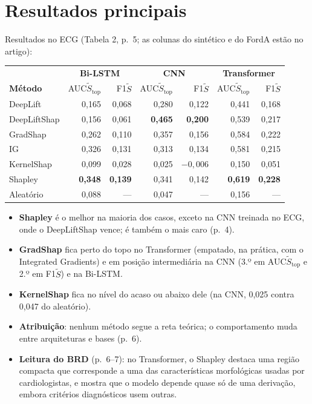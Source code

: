 \documentclass[11pt,a4paper]{article}
\begin{document}
\section{Resultados principais}
Resultados no ECG (Tabela 2, p.~5; as colunas do sintético e do FordA estão no artigo):
\begin{center}\small
\begin{tabular}{l|rr|rr|rr}
\toprule
& \multicolumn{2}{c|}{\textbf{Bi-LSTM}} & \multicolumn{2}{c|}{\textbf{CNN}} & \multicolumn{2}{c}{\textbf{Transformer}} \\
\textbf{Método} & AUC$\tilde{S}_{\text{top}}$ & F1$\tilde{S}$ & AUC$\tilde{S}_{\text{top}}$ & F1$\tilde{S}$ & AUC$\tilde{S}_{\text{top}}$ & F1$\tilde{S}$ \\
\midrule
DeepLift     & 0,165 & 0,068 & 0,280 & 0,122 & 0,441 & 0,168 \\
DeepLiftShap & 0,156 & 0,061 & \textbf{0,465} & \textbf{0,200} & 0,539 & 0,217 \\
GradShap     & 0,262 & 0,110 & 0,357 & 0,156 & 0,584 & 0,222 \\
IG           & 0,326 & 0,131 & 0,313 & 0,134 & 0,581 & 0,215 \\
KernelShap   & 0,099 & 0,028 & 0,025 & $-0{,}006$ & 0,150 & 0,051 \\
Shapley      & \textbf{0,348} & \textbf{0,139} & 0,341 & 0,142 & \textbf{0,619} & \textbf{0,228} \\
Aleatório    & 0,088 & --- & 0,047 & --- & 0,156 & --- \\
\bottomrule
\end{tabular}
\end{center}
\begin{itemize}
\item \textbf{Shapley} é o melhor na maioria dos casos, exceto na CNN treinada no ECG, onde o DeepLiftShap vence; é também o mais caro (p.~4).
\item \textbf{GradShap} fica perto do topo no Transformer (empatado, na prática, com o Integrated Gradients) e em posição intermediária na CNN (3.º em AUC$\tilde{S}_{\text{top}}$ e 2.º em F1$\tilde{S}$) e na Bi-LSTM.
\item \textbf{KernelShap} fica no nível do acaso ou abaixo dele (na CNN, 0,025 contra 0,047 do aleatório).
\item \textbf{Atribuição}: nenhum método segue a reta teórica; o comportamento muda entre arquiteturas e bases (p.~6).
\item \textbf{Leitura do BRD} (p.~6--7): no Transformer, o Shapley destaca uma região compacta que corresponde a uma das características morfológicas usadas por cardiologistas, e mostra que o modelo depende quase só de uma derivação, embora critérios diagnósticos usem outras.
\end{itemize}
\end{document}
